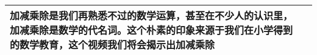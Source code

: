 \documentclass{article}
\begin{document}
\begin{CJK*}{UTF8}{gbsn}
\begin{tabularx}{0.928\textwidth}{ 
  | >{\raggedright\arraybackslash}X 
  | >{\raggedright\arraybackslash}X | }
加减乘除是我们再熟悉不过的数学运算，甚至在不少人的认识里，加减乘除是数学的代名词。这个朴素的印象来源于我们在小学得到的数学教育，这个视频我们将会揭示出加减乘除

 
& 


 
\\
\hline
\end{tabularx}
 










\end{CJK*}

\bigskip  %
\end{document}
